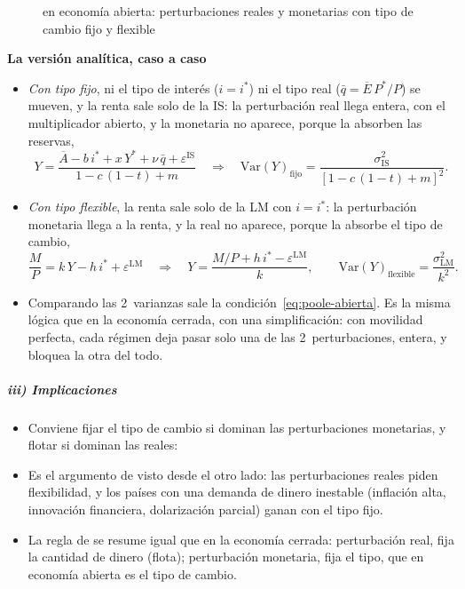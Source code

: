 \documentclass[11pt]{article}
\begin{document}
\begin{figure}[H]
\centering
\caption{ en economía abierta: perturbaciones reales y monetarias con tipo de cambio fijo y flexible}\label{fig:poole-abierta}
\end{figure}

\begin{anotaciones}
\textbf{La versión analítica, caso a caso}
\begin{itemize}
\item \emph{Con tipo fijo}, ni el tipo de interés ($i=i^*$) ni el tipo real ($\bar q=\overline E\,P^*/P$) se mueven, y la renta sale solo de la IS: la perturbación real llega entera, con el multiplicador abierto, y la monetaria no aparece, porque la absorben las reservas,
  $$Y=\frac{\overline{A}-b\,i^*+x\,Y^*+\nu\,\bar q+\varepsilon^{\mathrm{IS}}}{1-c\,(1-t)+m}\quad\Rightarrow\quad \mathrm{Var}(Y)_{\text{fijo}}=\frac{\sigma^2_{\mathrm{IS}}}{[1-c\,(1-t)+m]^2}.$$
\item \emph{Con tipo flexible}, la renta sale solo de la LM con $i=i^*$: la perturbación monetaria llega a la renta, y la real no aparece, porque la absorbe el tipo de cambio,
  $$\frac{M}{P}=k\,Y-h\,i^*+\varepsilon^{\mathrm{LM}}\quad\Rightarrow\quad Y=\frac{M/P+h\,i^*-\varepsilon^{\mathrm{LM}}}{k},\qquad \mathrm{Var}(Y)_{\text{flexible}}=\frac{\sigma^2_{\mathrm{LM}}}{k^2}.$$
\item Comparando las 2~varianzas sale la condición~\eqref{eq:poole-abierta}. Es la misma lógica que en la economía cerrada, con una simplificación: con movilidad perfecta, cada régimen deja pasar solo una de las 2~perturbaciones, entera, y bloquea la otra del todo.
\end{itemize}
\end{anotaciones}

\subparagraph{iii) Implicaciones}

\begin{itemize}
\item Conviene fijar el tipo de cambio si dominan las perturbaciones monetarias, y flotar si dominan las reales:
\item Es el argumento de \textcite{Friedman1953Case} visto desde el otro lado: las perturbaciones reales piden flexibilidad, y los países con una demanda de dinero inestable (inflación alta, innovación financiera, dolarización parcial) ganan con el tipo fijo.
\item La regla de  se resume igual que en la economía cerrada: perturbación real, fija la cantidad de dinero (flota); perturbación monetaria, fija el tipo, que en economía abierta es el tipo de cambio.
\end{itemize}
\end{document}
